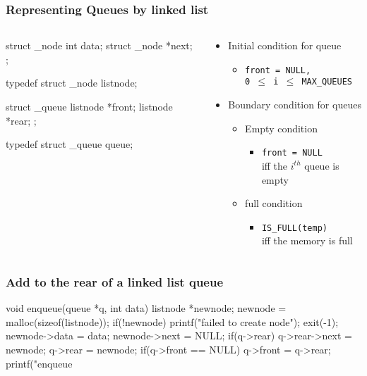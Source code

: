 \documentclass[newPxFont,sthlmFooter,nooffset]{beamer}
\begin{document}
\begin{frame}[t, fragile]
  \frametitle{Representing Queues by linked list}
  \begin{columns}
    \begin{column}{0.5\textwidth}
  \begin{ncodedef}
struct _node {
  int data;
  struct _node *next;
} ;

typedef struct _node listnode;

struct _queue {
  listnode *front;
  listnode *rear;
} ;

typedef struct _queue queue;   
  \end{ncodedef}      
    \end{column}
    \begin{column}{0.5\textwidth}
      \begin{itemize}
      \item Initial condition for queue
        \begin{itemize}
        \item \texttt{front = NULL, \\0 $\leq$ i $\leq$ MAX\_QUEUES}
        \end{itemize}
      \item Boundary condition for queues
        \begin{itemize}
        \item Empty condition
          \begin{itemize}
          \item \texttt{front = NULL} \\iff the $i^{th}$ queue is empty
          \end{itemize}

        \item full condition
          \begin{itemize}
          \item \texttt{IS\_FULL(temp)} \\iff the memory is full
          \end{itemize}

        \end{itemize}


      \end{itemize}
    \end{column}
  \end{columns}

\end{frame}

\begin{frame}[t, fragile]
  \frametitle{Add to the rear of a linked list queue}
  \begin{ncodedef}
void enqueue(queue *q, int data)
{
  listnode *newnode;
  newnode = malloc(sizeof(listnode));
  if(!newnode)
  {
    printf("failed to create node\n");
    exit(-1);
  }
  newnode->data = data;
  newnode->next = NULL;
  if(q->rear)
    q->rear->next = newnode;
  q->rear = newnode;
  if(q->front == NULL)
    q->front = q->rear;
  printf("enqueue %
}    
  \end{ncodedef}
\end{frame}
\end{document}
